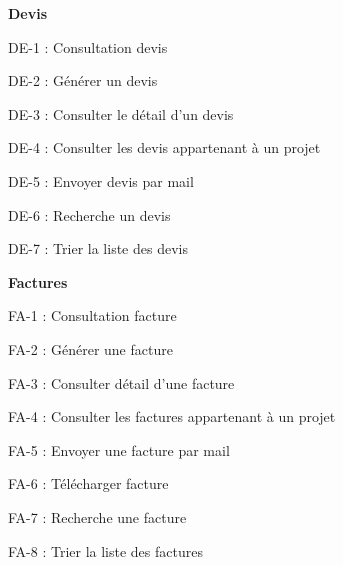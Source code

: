 \textbf{Devis}
\begin{todolist}
    \item[\done] DE-1 : Consultation devis
    \item[\done] DE-2 : Générer un devis
    \item[\done] DE-3 : Consulter le détail d'un devis 
    \item[\done] DE-4 : Consulter les devis appartenant à un projet
    \item[\done] DE-5 : Envoyer devis par mail
    \item[\done] DE-6 : Recherche un devis
    \item[\done] DE-7 : Trier la liste des devis
\end{todolist}

\textbf{Factures}
\begin{todolist}
    \item[\done] FA-1 : Consultation facture
    \item[\done] FA-2 : Générer une facture
    \item[\done] FA-3 : Consulter détail d'une facture
    \item[\done] FA-4 : Consulter les factures appartenant à un projet
    \item[\done] FA-5 : Envoyer une facture par mail
    \item[\done] FA-6 : Télécharger facture
    \item[\done] FA-7 : Recherche une facture
    \item[\done] FA-8 : Trier la liste des factures

\end{todolist}